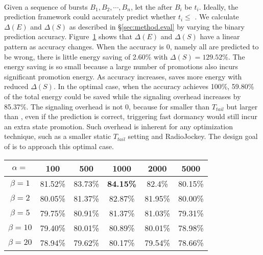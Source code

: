 \begin{figure}[h]
\centering
{} \\
\label{fig:accuracy}
\end{figure}


Given a sequence of bursts $B_{1}, B_{2}, \cdots, B_{n}$, let the \IBT after $B_{i}$ be $t_{i}$. Ideally, the prediction framework could accurately predict whether $t_{i} \leq $ \SBT. We calculate $\Delta(E)$ and $\Delta(S)$ as described in \S\ref{sec:method.eval} by varying the binary prediction accuracy. Figure~\ref{fig:accuracy} shows that $\Delta(E)$ and $\Delta(S)$ have a linear pattern as accuracy changes. When the accuracy is 0, namely all \IBTS are predicted to be wrong, there is little energy saving of 2.60\% with $\Delta(S) = 129.52\%$. The energy saving is so small because a large number of promotions also incurs significant promotion energy.
As accuracy increases, \NAME saves more energy with reduced $\Delta(S)$. In the optimal case, when the accuracy achieves 100\%, 59.80\% of the total energy could be saved while the signaling overhead increases by 85.37\%. The signaling overhead is not 0, because for \IBTS smaller than $T_{tail}$ but larger than \SBT, even if the prediction is correct, triggering fast dormancy would still incur an extra state promotion. Such overhead is inherent for any optimization technique, such as a smaller static $T_{tail}$ setting and RadioJockey. The design goal of \NAME is to approach this optimal case.


\begin{table}[t]
\begin{center}
\begin{tabular}{|c|c|c|c|c|c|}\hline
$\alpha=$ & 100 & 500 & 1000 & 2000 & 5000\\\hline
$\beta=1$ & 81.52\% & 83.73\% & \textbf{84.15\%} & 82.4\% & 80.15\%\\\hline
$\beta=2$ & 80.05\% & 81.37\% & 82.87\% & 81.95\% & 80.00\%\\\hline
$\beta=5$ & 79.75\% & 80.91\% & 81.37\% & 81.03\% & 79.31\%\\\hline
$\beta=10$ & 79.40\% & 80.01\% & 80.89\% & 80.01\% & 78.98\%\\\hline
$\beta=20$ & 78.94\% & 79.62\% & 80.17\% & 79.54\% & 78.66\%\\\hline
\end{tabular}
\label{tab:alphabeta}
\end{center}
\end{table}

